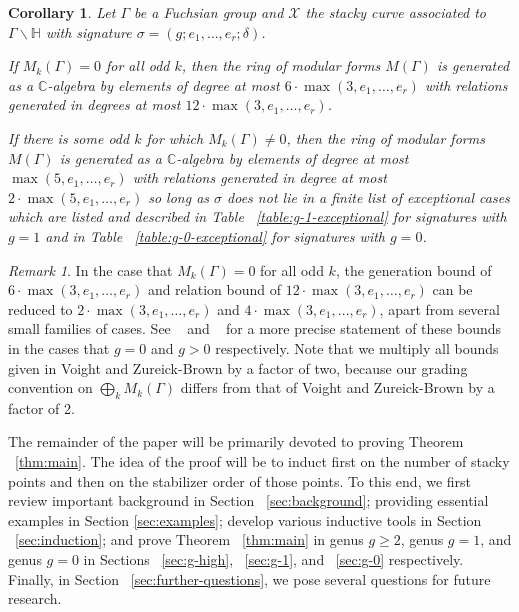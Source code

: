 \documentclass{amsart}
\theoremstyle{plain}
\newtheorem{cor}[thm]{Corollary}
\theoremstyle{definition}
\theoremstyle{remark}
\newtheorem{rem}[thm]{Remark}
\numberwithin{equation}{section}
\newcommand\BH{{\mathbb H}}
\newcommand\BC{{\mathbb C}}
\newcommand\sx{\mathscr X}
\begin{document}
\begin{cor}
\label{cor:main-mod-forms}
Let $\Gamma$ be a Fuchsian group and $\sx$ the stacky curve
associated to $\Gamma \backslash \BH$ with signature $\sigma
= (g; e_1, \ldots, e_r; \delta)$. 

If $M_k(\Gamma) = 0$ for all odd $k$, then the ring of modular
forms $M(\Gamma)$ is generated as a $\BC$-algebra by elements of
degree at most $6 \cdot \max(3, e_1, \ldots, e_r)$ with relations
generated in degrees at most $12 \cdot \max(3, e_1, \ldots, e_r)$.

If there is some odd $k$ for which $M_k(\Gamma) \neq 0$, then the
ring of modular forms $M(\Gamma)$ is generated as a $\BC$-algebra
by elements of degree at most $\max(5, e_1, \ldots, e_r)$ with
relations generated in degree at most $2 \cdot \max(5, e_1, \ldots, 
e_r)$ so long as $\sigma$ does not lie in a finite list of
exceptional cases which are listed and described in Table
~\ref{table:g-1-exceptional} for signatures with $g = 1$ and in
Table ~\ref{table:g-0-exceptional} for signatures with $g = 0$.
\end{cor}

\begin{rem}
\label{rem:factor-two}
In the case that $M_k(\Gamma) = 0$ for all odd $k$, the generation bound of $6 \cdot \max(3, e_1, \ldots, e_r)$ and relation
bound of $12 \cdot \max(3, e_1, \ldots, e_r)$ can be reduced to $2\cdot \max(3,e_1, \ldots, e_r)$ and $4 \cdot \max(3,e_1, \ldots, e_r)$, apart from several small families of cases. See 
~\cite[Theorem 9.3.1]{vzb:stacky} and ~\cite[Theorem 8.7.1]{vzb:stacky} for a more precise statement of these bounds in the cases that $g = 0$ and $g > 0$ respectively. Note that we multiply all bounds given in Voight and Zureick-Brown \cite{vzb:stacky} by a factor of two, because our grading convention on $\bigoplus_k M_k(\Gamma)$ differs from that of Voight and Zureick-Brown by a factor of 2.
\end{rem}

The remainder of the paper will be primarily devoted to proving
Theorem ~\ref{thm:main}. The idea of the
proof will be to induct first on the number of stacky points and then on the stabilizer order of those points.  To this end, we first review important background in
Section ~\ref{sec:background}; providing essential examples in Section \ref{sec:examples}; develop various inductive
tools in Section ~\ref{sec:induction}; and prove Theorem ~\ref{thm:main} in genus $g\ge 2$, genus $g=1$, and genus $g=0$ in Sections ~\ref{sec:g-high},
~\ref{sec:g-1}, and ~\ref{sec:g-0} respectively.  
Finally, in Section
~\ref{sec:further-questions}, we pose several questions for future
research.
\end{document}
